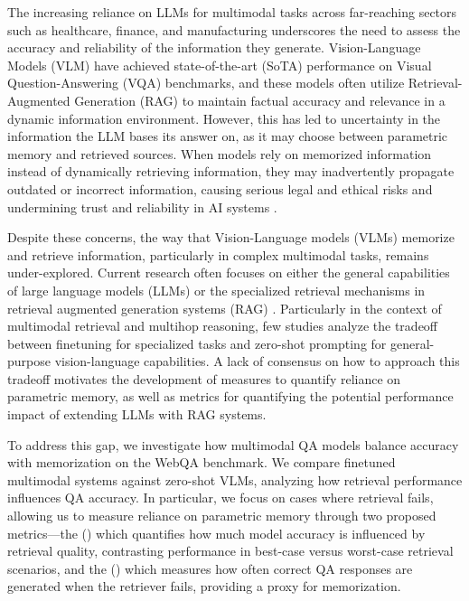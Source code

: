 
The increasing reliance on LLMs for multimodal tasks across far-reaching sectors such as healthcare, finance, and manufacturing underscores the need to assess the accuracy and reliability of the information they generate. Vision-Language Models (VLM) have achieved state-of-the-art (SoTA) performance on Visual Question-Answering (VQA) benchmarks, and these models often utilize Retrieval-Augmented Generation (RAG) to maintain factual accuracy and relevance in a dynamic information environment. However, this has led to uncertainty in the information the LLM bases its answer on, as it may choose between parametric memory and retrieved sources. When models rely on memorized information instead of dynamically retrieving information, they may inadvertently propagate outdated or incorrect information, causing serious legal and ethical risks and undermining trust and reliability in AI systems \citep{huang2023survey}.

Despite these concerns, the way that Vision-Language models (VLMs) memorize and retrieve information, particularly in complex multimodal tasks, remains under-explored. Current research often focuses on either the general capabilities of large language models (LLMs) or the specialized retrieval mechanisms in retrieval augmented generation systems (RAG) \citep{incontext_rag,chen_murag_2022,liu_universal_2023}. Particularly in the context of multimodal retrieval and multihop reasoning, few studies analyze the tradeoff between finetuning for specialized tasks and zero-shot prompting for general-purpose vision-language capabilities. A lack of consensus on how to approach this tradeoff motivates the development of measures to quantify reliance on parametric memory, as well as metrics for quantifying the potential performance impact of extending LLMs with RAG systems.

To address this gap, we investigate how multimodal QA models balance accuracy with memorization on the WebQA benchmark. We compare finetuned multimodal systems against zero-shot VLMs, analyzing how retrieval performance influences QA accuracy. In particular, we focus on cases where retrieval fails, allowing us to measure reliance on parametric memory through two proposed metrics---the \ppr (\PPR) which quantifies how much model accuracy is influenced by retrieval quality, contrasting performance in best-case versus worst-case retrieval scenarios, and the \ucr (\UCR) which measures how often correct QA responses are generated when the retriever fails, providing a proxy for memorization.

